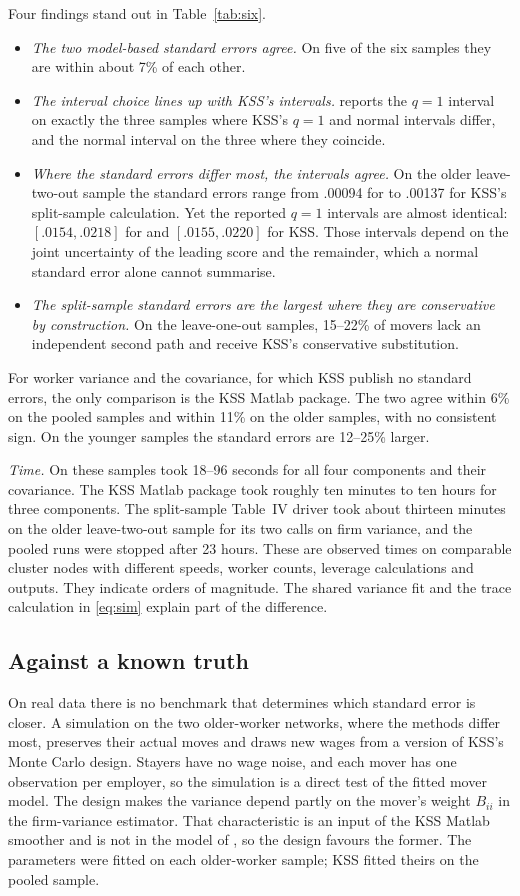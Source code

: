 Four findings stand out in Table~\ref{tab:six}.
\begin{itemize}
\item \emph{The two model-based standard errors agree.} On five of the six samples
they are within about 7\% of each other.
\item \emph{The interval choice lines up with KSS's intervals.} \fevc{} reports the $q=1$ interval
on exactly the three samples where KSS's $q=1$ and normal intervals differ, and the
normal interval on the three where they coincide.
\item \emph{Where the standard errors differ most, the intervals agree.} On the older
leave-two-out sample the standard errors range from .00094 for \fevc{} to .00137 for
KSS's split-sample calculation. Yet the reported $q=1$ intervals are almost identical:
$[.0154,.0218]$ for \fevc{} and $[.0155,.0220]$ for KSS. Those intervals depend on the
joint uncertainty of the leading score and the remainder, which a normal standard
error alone cannot summarise.
\item \emph{The split-sample standard errors are the largest where they are
conservative by construction.} On the leave-one-out samples, 15--22\% of movers lack
an independent second path and receive KSS's conservative substitution.
\end{itemize}
For worker variance and the covariance, for which KSS publish no standard errors,
the only comparison is the KSS Matlab package. The two agree within 6\% on the pooled
samples and within 11\% on the older samples, with no consistent sign. On the younger
samples the \fevc{} standard errors are 12--25\% larger.

\emph{Time.} On these samples \fevc{} took 18--96 seconds for all four components and
their covariance. The KSS Matlab package took roughly ten minutes to ten hours for
three components. The split-sample Table~IV driver took about thirteen minutes on the
older leave-two-out sample for its two calls on firm variance, and the pooled runs
were stopped after 23 hours. These are observed times on comparable cluster
nodes with different speeds, worker counts, leverage calculations and outputs.
They indicate orders of magnitude. The shared variance fit and the trace
calculation in \eqref{eq:sim} explain part of the difference.

\subsection{Against a known truth}\label{kss:sec:synth}
On real data there is no benchmark that determines which standard error is
closer. A simulation on the two older-worker networks, where the methods differ most,
preserves their actual moves and draws new wages from a version of KSS's Monte Carlo
design. Stayers have no wage noise, and each mover has one observation per employer,
so the simulation is a direct test of the fitted mover model. The design makes the
variance depend partly on the mover's weight $B_{ii}$ in the firm-variance estimator.
That characteristic is an input of the KSS Matlab smoother and is not in the model of
\fevc{}, so the design favours the former. The parameters were fitted on each
older-worker sample; KSS fitted theirs on the pooled sample.

